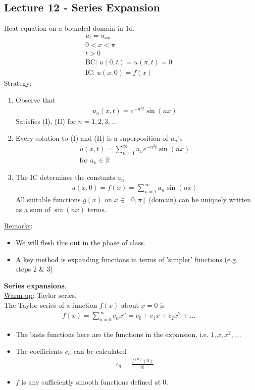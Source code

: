 \documentclass[12pt, letterpaper]{article}
\begin{document}
\subsection{Lecture 12 - Series Expansion} 
 Heat equation on a bounded domain in 1d.
\begin{align*}
    u_t = u_{xx} \tag{I}\\
    0 < x < \pi \\
    t > 0  \\
    \text{BC: } u(0,t) = u(\pi,t) = 0 \tag{II} \\
    \text{IC: } u(x,0) = f(x) \tag{III}
\end{align*}
Strategy:
\begin{enumerate}
    \item Observe that 
    \begin{align*}
        u_n(x,t) = e^{-n^2t}\sin(nx)
    \end{align*}
    Satisfies (I), (II) for $n = 1,2,3,\dots$
    \item Every solution to (I) and (II) is a superposition of $u_n$'s
    \begin{align*}
        u(x,t) = \sum_{n=1}^{\infty} a_n e^{-n^2t} \sin(nx) \\
        \text{for } a_n \in \mathbb{R}
    \end{align*}
    \item The IC determines the constants $a_n$
    \begin{align*}
        u(x,0) = f(x) = \sum_{n=1}^{\infty} a_n \sin(nx)
    \end{align*}
    All suitable functions $g(x)$ on $x \in [0,\pi]$ (domain) can be uniquely written as a sum of
    $\sin(nx)$ terms. 
\end{enumerate}
\underline{Remarks}:
\begin{itemize}
    \item We will flesh this out in the phase of class.
    \item A key method is expanding functions in terms of 'simpler' functions (e.g. steps 2 \& 3)
\end{itemize}
\textbf{Series expansions}. \\
\underline{Warm-up}: Taylor series. \\
The Taylor series of a function $f(x)$ about $x = 0$ is 
\begin{align*}
    f(x) = \sum_{n=0}^{\infty}c_nx^n = c_0 + c_1x + c_2x^2 + \dots
\end{align*}
\begin{itemize}
    \item The basis functions here are the functions in the expansion, i.e. $1,x,x^2,\dots$.
    \item The coefficients $c_n$ can be calculated 
    \begin{align*}
        c_n = \frac{f^{(n)}(0)}{n!}
    \end{align*}
    \item $f$ is any sufficiently smooth functions defined at 0.
\end{itemize}
\end{document}
